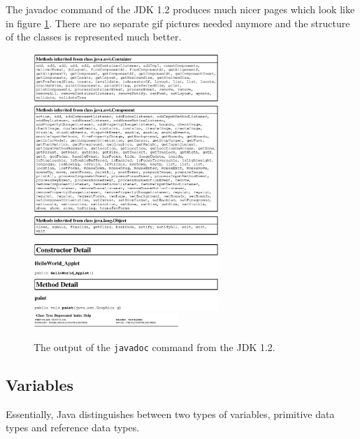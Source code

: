The javadoc command of the JDK 1.2 produces much nicer pages which
look like in figure \ref{fig:Java2HTMLDoc}. There are no separate 
gif pictures
needed anymore and the structure of the classes is represented
much better.
\begin{figure}[htbp]
  \begin{center}
    \includegraphics[width=7cm]{Figures/HelloWorldApplet2.eps}
    \includegraphics[width=5.5cm]{Figures/HelloWorldApplication2.eps}
    \caption{The output of the \texttt{javadoc} command from the JDK 1.2.}
    \label{fig:Java2HTMLDoc}
  \end{center}
\end{figure}

\subsection{Variables}
\label{sec:Variables}

Essentially, Java distinguishes between two types of variables,
primitive data types and reference data types.
